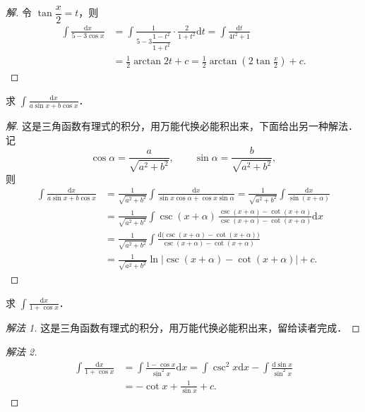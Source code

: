 \begin{proof}[解]
令 $\tan\dfrac{x}{2} = t$，则
\[
\begin{aligned}
\int\frac{\mathrm{d}x}{5-3\cos x}
&= \int\frac{1}{5-3\dfrac{1-t^{2}}{1+t^{2}}}\cdot\frac{2}{1+t^{2}}\mathrm{d}t
= \int\frac{\mathrm{d}t}{4t^{2}+1}\\
&= \frac{1}{2}\arctan 2t+c
= \frac{1}{2}\arctan\left(2\tan\frac{x}{2}\right)+c.
\end{aligned}
\]
\end{proof}

\begin{example}\label{ex:6-2-25}
求 $\displaystyle\int\frac{\mathrm{d}x}{a\sin x+b\cos x}$．
\end{example}

\begin{proof}[解]
这是三角函数有理式的积分，用万能代换必能积出来，下面给出另一种解法．记
\[
\cos\alpha = \frac{a}{\sqrt{a^{2}+b^{2}}},\qquad \sin\alpha = \frac{b}{\sqrt{a^{2}+b^{2}}},
\]
则
\[
\begin{aligned}
\int\frac{\mathrm{d}x}{a\sin x+b\cos x}
&= \frac{1}{\sqrt{a^{2}+b^{2}}}\int\frac{\mathrm{d}x}{\sin x\cos\alpha+\cos x\sin\alpha}
= \frac{1}{\sqrt{a^{2}+b^{2}}}\int\frac{\mathrm{d}x}{\sin(x+\alpha)}\\
&= \frac{1}{\sqrt{a^{2}+b^{2}}}\int\csc(x+\alpha)\,
\frac{\csc(x+\alpha)-\cot(x+\alpha)}{\csc(x+\alpha)-\cot(x+\alpha)}\mathrm{d}x\\
&= \frac{1}{\sqrt{a^{2}+b^{2}}}\int
\frac{\mathrm{d}\big(\csc(x+\alpha)-\cot(x+\alpha)\big)}{\csc(x+\alpha)-\cot(x+\alpha)}\\
&= \frac{1}{\sqrt{a^{2}+b^{2}}}\ln\big|\csc(x+\alpha)-\cot(x+\alpha)\big|+c.
\end{aligned}
\]
\end{proof}

\begin{example}\label{ex:6-2-26}
求 $\displaystyle\int\frac{\mathrm{d}x}{1+\cos x}$．
\end{example}

\begin{proof}[解法 1]
这是三角函数有理式的积分，用万能代换必能积出来，留给读者完成．
\end{proof}

\begin{proof}[解法 2]
\[
\begin{aligned}
\int\frac{\mathrm{d}x}{1+\cos x}
&= \int\frac{1-\cos x}{\sin^{2}x}\mathrm{d}x
= \int\csc^{2}x\mathrm{d}x-\int\frac{\mathrm{d}\sin x}{\sin^{2}x}\\
&= -\cot x+\frac{1}{\sin x}+c.
\end{aligned}
\]
\end{proof}

